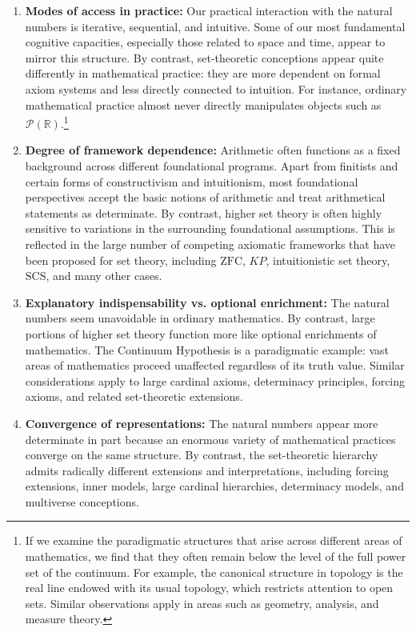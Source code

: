 \documentclass[11pt,a4paper]{book}
\theoremstyle{plain}
\begin{document}
\begin{enumerate}

  \item \textbf{Modes of access in practice:} Our practical interaction with the natural numbers is iterative, sequential, and intuitive. Some of our most fundamental cognitive capacities, especially those related to space and time, appear to mirror this structure. By contrast, set-theoretic conceptions appear quite differently in mathematical practice: they are more dependent on formal axiom systems and less directly connected to intuition. For instance, ordinary mathematical practice almost never directly manipulates objects such as $\mathcal{P}(\mathbb{R})$.\footnote{If we examine the paradigmatic structures that arise across different areas of mathematics, we find that they often remain below the level of the full power set of the continuum. For example, the canonical structure in topology is the real line endowed with its usual topology, which restricts attention to open sets. Similar observations apply in areas such as geometry, analysis, and measure theory.}

  \item \textbf{Degree of framework dependence:} Arithmetic often functions as a fixed background across different foundational programs. Apart from finitists and certain forms of constructivism and intuitionism, most foundational perspectives accept the basic notions of arithmetic and treat arithmetical statements as determinate. By contrast, higher set theory is often highly sensitive to variations in the surrounding foundational assumptions. This is reflected in the large number of competing axiomatic frameworks that have been proposed for set theory, including $\mathrm{ZFC}$, $KP$, intuitionistic set theory, $\mathrm{SCS}$, and many other cases.
  
  \item \textbf{Explanatory indispensability vs. optional enrichment:} The natural numbers seem unavoidable in ordinary mathematics. By contrast, large portions of higher set theory function more like optional enrichments of mathematics. The Continuum Hypothesis is a paradigmatic example: vast areas of mathematics proceed unaffected regardless of its truth value. Similar considerations apply to large cardinal axioms, determinacy principles, forcing axioms, and related set-theoretic extensions.
  
  \item \textbf{Convergence of representations:} The natural numbers appear more determinate in part because an enormous variety of mathematical practices converge on the same structure. By contrast, the set-theoretic hierarchy admits radically different extensions and interpretations, including forcing extensions, inner models, large cardinal hierarchies, determinacy models, and multiverse conceptions.
  
\end{enumerate}
\end{document}
